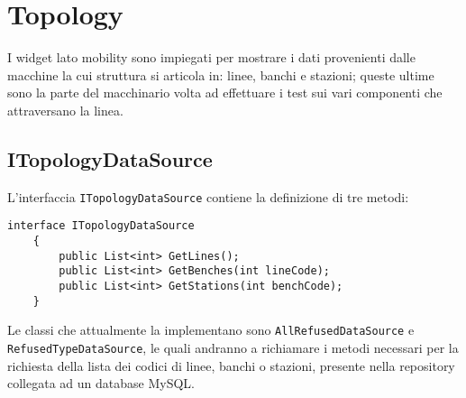 \section{Topology}
\label{chap:topology}
I widget lato mobility sono impiegati per mostrare i dati provenienti dalle macchine la cui struttura si articola in: linee, banchi e stazioni; queste ultime sono la parte del macchinario volta ad effettuare i test sui vari componenti che attraversano la linea.

\subsection{ITopologyDataSource}
L'interfaccia \verb|ITopologyDataSource| contiene la definizione di tre metodi:
\\
\begin{lstlisting}[caption={TopologyController.cs}, style=javaScriptCode, label={lst:cacheattribute}]
    interface ITopologyDataSource
    {
        public List<int> GetLines();
        public List<int> GetBenches(int lineCode);
        public List<int> GetStations(int benchCode);
    }
\end{lstlisting}
Le classi che attualmente la implementano sono \verb|AllRefusedDataSource| e\\ \verb|RefusedTypeDataSource|, le quali andranno a richiamare i metodi necessari per la richiesta della lista dei codici di linee, banchi o stazioni, presente nella repository collegata ad un database MySQL.

